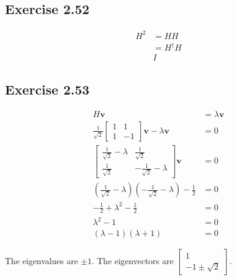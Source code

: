 \documentclass{article}
\renewcommand{\vec}[1]{\boldsymbol{\mathbf{#1}}}
\begin{document}
\subsection*{Exercise 2.52}

\begin{align*}
  H^2 & = H H         \\
      & = H^\dagger H \\
      & I
\end{align*}

\subsection*{Exercise 2.53}

\begin{align*}
  H \vec{v}                                                                                              & = \lambda \vec{v}      \\
  \frac{1}{\sqrt{2}} \begin{bmatrix}
                       1 & 1  \\
                       1 & -1
                     \end{bmatrix} \vec{v} - \lambda \vec{v}                                                                & = 0 \\
  \begin{bmatrix}
    \frac{1}{\sqrt{2}} - \lambda & \frac{1}{\sqrt{2}}            \\
    \frac{1}{\sqrt{2}}           & -\frac{1}{\sqrt{2}} - \lambda
  \end{bmatrix} \vec{v}              & = 0                                          \\
  \left( \frac{1}{\sqrt{2}} - \lambda \right) \left( -\frac{1}{\sqrt{2}} - \lambda \right) - \frac{1}{2} & = 0                    \\
  -\frac{1}{2} + \lambda^2 - \frac{1}{2}                                                                 & = 0                    \\
  \lambda^2 - 1                                                                                          & = 0                    \\
  (\lambda - 1) (\lambda + 1)                                                                            & = 0
\end{align*}

The eigenvalues are $\pm 1$. The eigenvectors are $\begin{bmatrix}
    1 \\
    -1 \pm \sqrt{2}
  \end{bmatrix}$.
\end{document}

